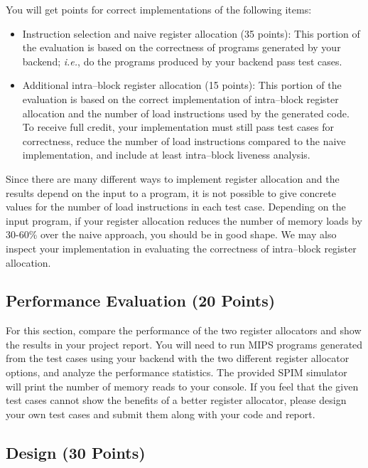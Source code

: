 \documentclass[12pt]{article}
\begin{document}
You will get points for correct implementations of the following items:
\begin{itemize}
    \item Instruction selection and naive register allocation (35 points): This portion of the evaluation is based on the correctness of programs generated by your backend; \textit{i.e.}, do the programs produced by your backend pass test cases.
    \item Additional intra--block register allocation (15 points): This portion of the evaluation is based on the correct implementation of intra--block register allocation and the number of load instructions used by the generated code. To receive full credit, your implementation must still pass test cases for correctness, reduce the number of load instructions compared to the naive implementation, and include at least intra--block liveness analysis.
\end{itemize}

Since there are many different ways to implement register allocation and the results depend on the input to a program, it is not possible to give concrete values for the number of load instructions in each test case. Depending on the input program, if your register allocation reduces the number of memory loads by 30-60\% over the naive approach, you should be in good shape. We may also inspect your implementation in evaluating the correctness of intra--block register allocation.


\subsection{Performance Evaluation (20 Points)}\label{sec:eval}

For this section, compare the performance of the two register allocators and show the results in your project report. You will need to run MIPS programs generated from the test cases using your backend with the two different register allocator options, and analyze the performance statistics. The provided SPIM simulator will print the number of memory reads to your console. If you feel that the given test cases cannot show the benefits of a better register allocator, please design your own test cases and submit them along with your code and report.

\subsection{Design (30 Points)}\label{sec:design}
\end{document}
